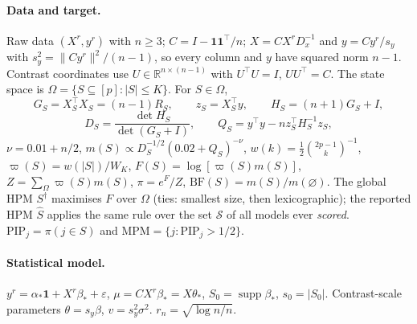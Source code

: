 \documentclass[11pt,a4paper]{article}
\theoremstyle{plain}
\theoremstyle{definition}
\theoremstyle{remark}
\newcommand{\R}{\mathbb{R}}
\newcommand{\calS}{\mathcal{S}}
\newcommand{\Sz}{S_0}
\newcommand{\Sdag}{S^{\dagger}}
\newcommand{\Shat}{\widehat S}
\newcommand{\sz}{s_0}
\newcommand{\PIP}{\mathrm{PIP}}
\newcommand{\MPM}{\mathrm{MPM}}
\newcommand{\BF}{\mathrm{BF}}
\newcommand{\rn}{r_n}
\begin{document}
\paragraph{Data and target.} Raw data $(X^r,y^r)$ with $n\ge3$; $C=I-\mathbf 1\mathbf 1^\top/n$; $X=CX^rD_x^{-1}$ and $y=Cy^r/s_y$ with $s_y^2=\|Cy^r\|^2/(n-1)$, so every column and $y$ have squared norm $n-1$. Contrast coordinates use $U\in\R^{n\times(n-1)}$ with $U^\top U=I$, $UU^\top=C$. The state space is $\Omega=\{S\subseteq[p]:|S|\le K\}$. For $S\in\Omega$,
\[
G_S=X_S^\top X_S=(n-1)R_S,\qquad z_S=X_S^\top y,\qquad H_S=(n+1)G_S+I,
\]
\[
D_S=\frac{\det H_S}{\det(G_S+I)},\qquad Q_S=y^\top y-nz_S^\top H_S^{-1}z_S,
\]
$\nu=0.01+n/2$, $m(S)\propto D_S^{-1/2}(0.02+Q_S)^{-\nu}$, $w(k)=\tfrac12\binom{2p-1}{k}^{-1}$, $\varpi(S)=w(|S|)/W_K$, $F(S)=\log[\varpi(S)m(S)]$, $Z=\sum_\Omega\varpi(S)m(S)$, $\pi=e^F/Z$, $\BF(S)=m(S)/m(\varnothing)$. The global HPM $\Sdag$ maximises $F$ over $\Omega$ (ties: smallest size, then lexicographic); the reported HPM $\Shat$ applies the same rule over the set $\calS$ of all models ever \emph{scored}. $\PIP_j=\pi(j\in S)$ and $\MPM=\{j:\PIP_j>1/2\}$.

\paragraph{Statistical model.} $y^r=\alpha_*\mathbf 1+X^r\beta_*+\varepsilon$, $\mu=CX^r\beta_*=X\theta_*$, $\Sz=\operatorname{supp}\beta_*$, $\sz=|\Sz|$. Contrast-scale parameters $\theta=s_y\beta$, $v=s_y^2\sigma^2$. $\rn=\sqrt{\log n/n}$.
\end{document}

